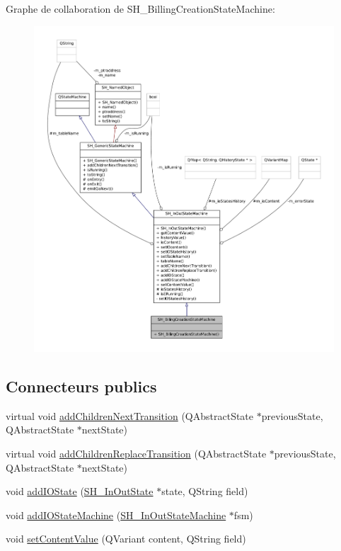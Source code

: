 Graphe de collaboration de S\-H\-\_\-\-Billing\-Creation\-State\-Machine\-:
\nopagebreak
\begin{figure}[H]
\begin{center}
\leavevmode
\includegraphics[width=350pt]{classSH__BillingCreationStateMachine__coll__graph}
\end{center}
\end{figure}
\subsection*{Connecteurs publics}
\begin{DoxyCompactItemize}
\item 
virtual void \hyperlink{classSH__InOutStateMachine_aa78420f8778d7777809aad77eb8473b4}{add\-Children\-Next\-Transition} (Q\-Abstract\-State $\ast$previous\-State, Q\-Abstract\-State $\ast$next\-State)
\item 
virtual void \hyperlink{classSH__InOutStateMachine_ae0f3b4622d2c70884bb224dee86e95c0}{add\-Children\-Replace\-Transition} (Q\-Abstract\-State $\ast$previous\-State, Q\-Abstract\-State $\ast$next\-State)
\item 
void \hyperlink{classSH__InOutStateMachine_a2528cffddbe6f98c32ebef41423c0118}{add\-I\-O\-State} (\hyperlink{classSH__InOutState}{S\-H\-\_\-\-In\-Out\-State} $\ast$state, Q\-String field)
\item 
void \hyperlink{classSH__InOutStateMachine_a6f65dff277508e650eb697628c857b19}{add\-I\-O\-State\-Machine} (\hyperlink{classSH__InOutStateMachine}{S\-H\-\_\-\-In\-Out\-State\-Machine} $\ast$fsm)
\item 
void \hyperlink{classSH__InOutStateMachine_a9ab1534306b2bdb62743d4bcefe40c17}{set\-Content\-Value} (Q\-Variant content, Q\-String field)
\end{DoxyCompactItemize}
